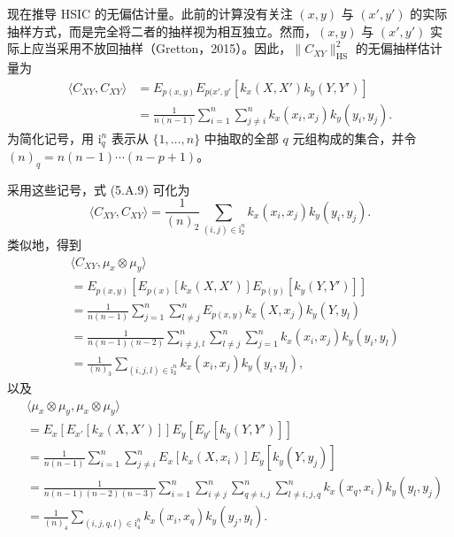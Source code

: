 现在推导 HSIC 的无偏估计量。此前的计算没有关注 $(x,y)$ 与 $(x',y')$ 的实际抽样方式，而是完全将二者的抽样视为相互独立。然而，$(x,y)$ 与 $(x',y')$ 实际上应当采用不放回抽样（Gretton，2015）。因此，$\lVert C_{XY}\rVert_{\mathrm{HS}}^2$ 的无偏抽样估计量为
\begin{equation}
\begin{aligned}
\langle C_{XY},C_{XY}\rangle
&=E_{p(x,y)}E_{p(x',y'}[k_x(X,X')k_y(Y,Y')]\\
&=\frac1{n(n-1)}\sum_{i=1}^n\sum_{j\ne i}^nk_x(x_i,x_j)k_y(y_i,y_j).
\end{aligned}
\tag{5.A.9}
\end{equation}
为简化记号，用 $\mathrm i_q^n$ 表示从 $\{1,\ldots,n\}$ 中抽取的全部 $q$ 元组构成的集合，并令 $(n)_q=n(n-1)\cdots(n-p+1)$。

采用这些记号，式 (5.A.9) 可化为
\begin{equation}
\langle C_{XY},C_{XY}\rangle
=\frac1{(n)_2}\sum_{(i,j)\in\mathrm i_2^n}k_x(x_i,x_j)k_y(y_i,y_j).
\tag{5.A.10}
\end{equation}
类似地，得到
\begin{equation}
\begin{aligned}
&\langle C_{XY},\mu_x\otimes\mu_y\rangle\\
&=E_{p(x,y)}[E_{p(x)}[k_x(X,X')]E_{p(y)}[k_y(Y,Y')]]\\
&=\frac1{n(n-1)}\sum_{j=1}^n\sum_{l\ne j}^nE_{p(x,y)}k_x(X,x_j)k_y(Y,y_l)\\
&=\frac1{n(n-1)(n-2)}\sum_{i\ne j,l}^n\sum_{l\ne j}^n\sum_{j=1}^nk_x(x_i,x_j)k_y(y_i,y_l)\\
&=\frac1{(n)_3}\sum_{(i,j,l)\in\mathrm i_3^n}k_x(x_i,x_j)k_y(y_i,y_l),
\end{aligned}
\tag{5.A.11}
\end{equation}
以及
\begin{equation}
\begin{aligned}
&\langle\mu_x\otimes\mu_y,\mu_x\otimes\mu_y\rangle\\
&=E_x[E_{x'}[k_x(X,X')]]E_y[E_{y'}[k_y(Y,Y')]]\\
&=\frac1{n(n-1)}\sum_{i=1}^n\sum_{j\ne i}^nE_x[k_x(X,x_i)]E_y[k_y(Y,y_j)]\\
&=\frac1{n(n-1)(n-2)(n-3)}
\sum_{i=1}^n\sum_{i\ne j}^n\sum_{q\ne i,j}^n\sum_{l\ne i,j,q}^nk_x(x_q,x_i)k_y(y_l,y_j)\\
&=\frac1{(n)_4}\sum_{(i,j,q,l)\in\mathrm i_4^n}k_x(x_i,x_q)k_y(y_j,y_l).
\end{aligned}
\tag{5.A.12}
\end{equation}

